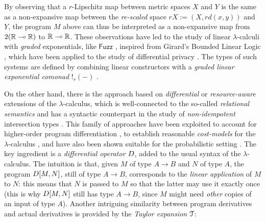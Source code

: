 By observing that a $r$-Lipschitz map between metric spaces $X$ and $Y$ is the same as a non-expansive map between the \emph{re-scaled} space $rX:=(X,%
rd(x,y))$ and $Y$, the program $M$ above 
can thus be interpreted as a non-expansive map from $2(\mathbb{R}\multimap \mathbb{R})$ to $\mathbb{R}\multimap \mathbb{R}$.
These observations have led to the study of linear $\lambda$-calculi with \emph{graded} exponentials, like $\mathsf{Fuzz}$ \cite{Reed2010}, inspired from Girard's Bounded Linear Logic \cite{Girard92tcs}, which have been applied to the study of differential privacy \cite{Gaboardi2013, Gaboardi2017}. The types of such systems are defined by combining linear constructors with a \emph{graded linear exponential comonad} $!_{r}(-)$ \cite{Katsumata2018}.

On the other hand, there is the approach based on \emph{differential} \cite{difflambda} or \emph{resource-aware} \cite{Boudol1993} extensions of the $\lambda$-calculus, which is well-connected to the so-called \emph{relational semantics} \cite{Manzo2012, Manzo2013, dill} and has a syntactic counterpart in the study of \emph{non-idempotent} intersection types \cite{decarvalho2018, Mazza2016}. This family of approaches have been exploited to account for higher-order program differentiation \cite{difflambda}, to establish reasonable \emph{cost-models} for the $\lambda$-calculus \cite{Accattoli2021}, and have also been shown suitable for the probabilistic setting \cite{Manzo2013, Breuvart2018, PistoneLICS2022}. 
The key ingredient is a \emph{differential operator} $\Der$,  added to the usual syntax of the $\lambda$-calculus. The intuition is that, given $M$ of type $A\to B$ and $N$ of type $A$, the program $\Diff{M}{N}$, still of type $A\to B$, corresponds to the \emph{linear application} of $M$ to $N$: this means that $N$ is passed to $M$ so that the latter may use it exactly once (this is why $\Diff{M}{N}$ still has type $A\to B$, since $M$ might need \emph{other} copies of an input of type $A$).
Another intriguing similarity between program derivatives and 
actual derivatives is provided by the \emph{Taylor expansion} $\mathcal{T}$:
